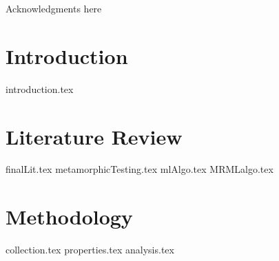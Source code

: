 \documentclass[print,ms]{unothesis}
\begin{document}
\frontmatter



\begin{acknowledgments}
 Acknowledgments here
\end{acknowledgments}


\setlength{\beforechapskip}{-40pt} %
\renewcommand*\contentsname{Table of Contents}
\tableofcontents  %
\listoffigures
\listoftables

\mainmatter


\chapter{Introduction}
{introduction.tex}
% 

\chapter{Literature Review}
{finalLit.tex}
{metamorphicTesting.tex}
{mlAlgo.tex}
{MRMLalgo.tex}

\chapter{Methodology}
{collection.tex}
\newpage
{properties.tex}
\newpage
{analysis.tex}
\end{document}
